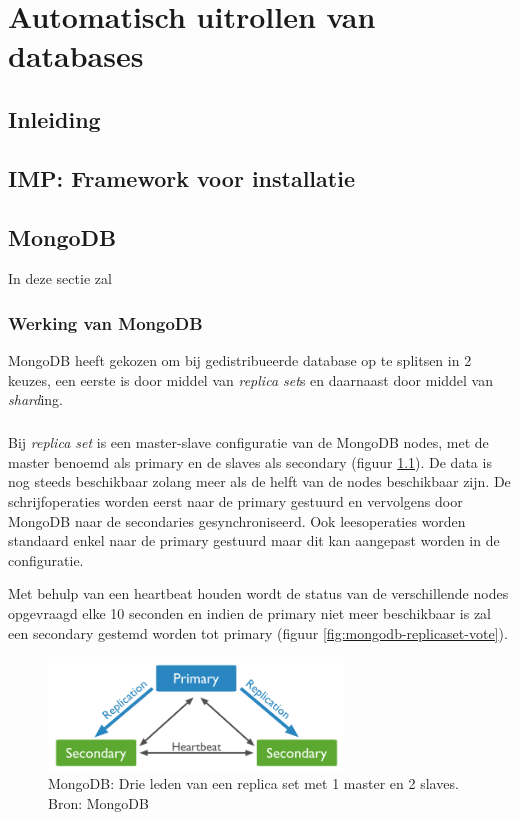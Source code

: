 \chapter{Automatisch uitrollen van databases}
\section{Inleiding}

\section{IMP: Framework voor installatie}

\section{MongoDB}
In deze sectie zal 

\subsection{Werking van MongoDB}
MongoDB heeft gekozen om bij gedistribueerde database op te splitsen in 2 keuzes, een eerste is door middel van \textit{replica set}s en daarnaast door middel van \textit{shard}ing. 

\paragraph{}Bij \textit{replica set} is een master-slave configuratie van de MongoDB nodes, met de master benoemd als primary en de slaves als secondary (figuur \ref{fig:mongodb-replicaset}). De data is nog steeds beschikbaar zolang meer als de helft van de nodes beschikbaar zijn. De schrijfoperaties worden eerst naar de primary gestuurd en vervolgens door MongoDB naar de secondaries gesynchroniseerd. Ook leesoperaties worden standaard enkel naar de primary gestuurd maar dit kan aangepast worden in de configuratie. 

Met behulp van een heartbeat houden wordt de status van de verschillende nodes opgevraagd elke 10 seconden en indien de primary niet meer beschikbaar is zal een secondary gestemd worden tot primary (figuur \ref{fig:mongodb-replicaset-vote}). 

\begin{figure}[!htb]
	    \centering
    \includegraphics[width=0.7\textwidth]{img/mongodb-replica-set-primary-with-two-secondaries.png}
    \caption{MongoDB: Drie leden van een replica set met 1 master en 2 slaves. Bron: MongoDB\cite{mongodb-replicaset}}
    \label{fig:mongodb-replicaset}
\end{figure}

